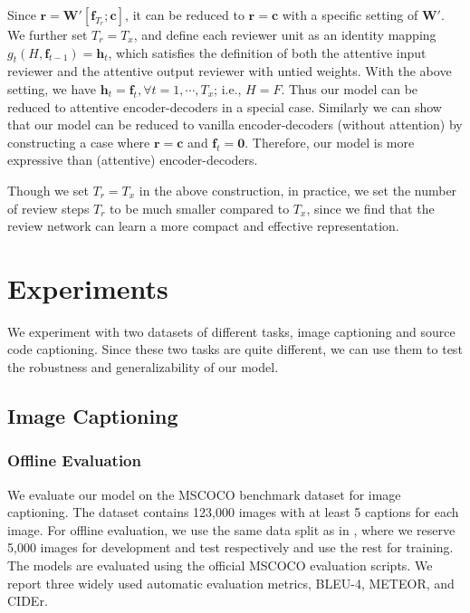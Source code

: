 \documentclass{article}
\begin{document}
Since $\mathbf{r} = \mathbf{W}'[\mathbf{f}_{T_r}; \mathbf{c}]$, it can be reduced to $\mathbf{r} = \mathbf{c}$ with a specific setting of $\mathbf{W}'$. We further set $T_r = T_x$, and define each reviewer unit as an identity mapping $g_t(H, \mathbf{f}_{t - 1}) = \mathbf{h}_t$, which satisfies the definition of both the attentive input reviewer and the attentive output reviewer with untied weights. With the above setting, we have $\mathbf{h}_t = \mathbf{f}_t, \forall t = 1, \cdots, T_x$; i.e., $H = F$. Thus our model can be reduced to attentive encoder-decoders in a special case. Similarly we can show that our model can be reduced to vanilla encoder-decoders (without attention) by constructing a case where $\mathbf{r} = \mathbf{c}$ and $\mathbf{f}_t = \mathbf{0}$. Therefore, our model is more expressive than (attentive) encoder-decoders.

Though we set $T_r = T_x$ in the above construction, in practice, we set the number of review steps $T_r$ to be much smaller compared to $T_x$, since we find that the review network can learn a more compact and effective representation.


\section{Experiments}

We experiment with two datasets of different tasks, image captioning and source code captioning. Since these two tasks are quite different, we can use them to test the robustness and generalizability of our model.

\subsection{Image Captioning}\subsubsection{Offline Evaluation}

We evaluate our model on the MSCOCO benchmark dataset \cite{chen2015microsoft} for image captioning. The dataset contains 123,000 images with at least 5 captions for each image. For offline evaluation, we use the same data split as in \cite{karpathy2015deep,xu2015show,you2016image}, where we reserve 5,000 images for development and test respectively and use the rest for training. The models are evaluated using the official MSCOCO evaluation scripts. We report three widely used automatic evaluation metrics, BLEU-4, METEOR, and CIDEr.
\end{document}
